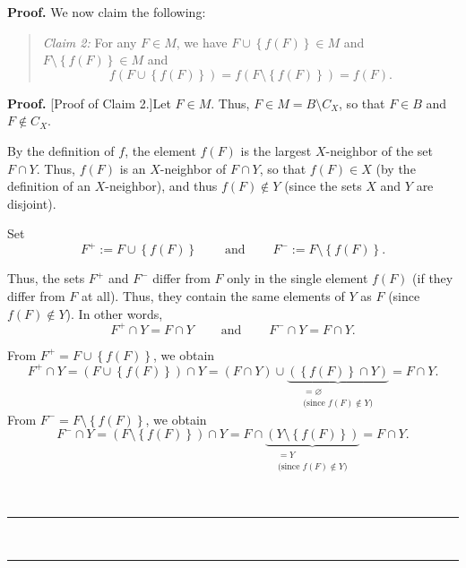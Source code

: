 \documentclass[numbers=enddot,12pt,final,onecolumn,notitlepage]{scrartcl}%
\theoremstyle{definition}
\newenvironment{statement}{\begin{quote}}{\end{quote}}
\newenvironment{proof}[1][Proof]{\noindent\textbf{#1.} }{\ \rule{0.5em}{0.5em}}
\newenvironment{verlong}{}{}
\newenvironment{vershort}{}{}
\begin{document}
\begin{proof}
We now claim the following:

\begin{statement}
\textit{Claim 2:} For any $F\in M$, we have $F\cup\left\{  f\left(  F\right)
\right\}  \in M$ and $F\setminus\left\{  f\left(  F\right)  \right\}  \in M$
and%
\[
f\left(  F\cup\left\{  f\left(  F\right)  \right\}  \right)  =f\left(
F\setminus\left\{  f\left(  F\right)  \right\}  \right)  =f\left(  F\right)
.
\]

\end{statement}

\begin{proof}
[Proof of Claim 2.]Let $F\in M$. Thus, $F\in M=B\setminus C_{X}$, so that
$F\in B$ and $F\notin C_{X}$.

By the definition of $f$, the element $f\left(  F\right)  $ is the largest
$X$-neighbor of the set $F\cap Y$. Thus, $f\left(  F\right)  $ is an
$X$-neighbor of $F\cap Y$, so that $f\left(  F\right)  \in X$ (by the
definition of an $X$-neighbor), and thus $f\left(  F\right)  \notin Y$ (since
the sets $X$ and $Y$ are disjoint).

Set%
\[
F^{+}:=F\cup\left\{  f\left(  F\right)  \right\}
\ \ \ \ \ \ \ \ \ \ \text{and}\ \ \ \ \ \ \ \ \ \ F^{-}:=F\setminus\left\{
f\left(  F\right)  \right\}  .
\]


\begin{vershort}
Thus, the sets $F^{+}$ and $F^{-}$ differ from $F$ only in the single element
$f\left(  F\right)  $ (if they differ from $F$ at all). Thus, they contain the
same elements of $Y$ as $F$ (since $f\left(  F\right)  \notin Y$). In other
words,%
\[
F^{+}\cap Y=F\cap Y\ \ \ \ \ \ \ \ \ \ \text{and}\ \ \ \ \ \ \ \ \ \ F^{-}\cap
Y=F\cap Y.
\]

\end{vershort}

\begin{verlong}
From $F^{+}=F\cup\left\{  f\left(  F\right)  \right\}  $, we obtain%
\[
F^{+}\cap Y=\left(  F\cup\left\{  f\left(  F\right)  \right\}  \right)  \cap
Y=\left(  F\cap Y\right)  \cup\underbrace{\left(  \left\{  f\left(  F\right)
\right\}  \cap Y\right)  }_{\substack{=\varnothing\\\text{(since }f\left(
F\right)  \notin Y\text{)}}}=F\cap Y.
\]
From $F^{-}=F\setminus\left\{  f\left(  F\right)  \right\}  $, we obtain%
\[
F^{-}\cap Y=\left(  F\setminus\left\{  f\left(  F\right)  \right\}  \right)
\cap Y=F\cap\underbrace{\left(  Y\setminus\left\{  f\left(  F\right)
\right\}  \right)  }_{\substack{=Y\\\text{(since }f\left(  F\right)  \notin
Y\text{)}}}=F\cap Y.
\]


\end{verlong}
\end{proof}
\end{proof}
\end{document}
